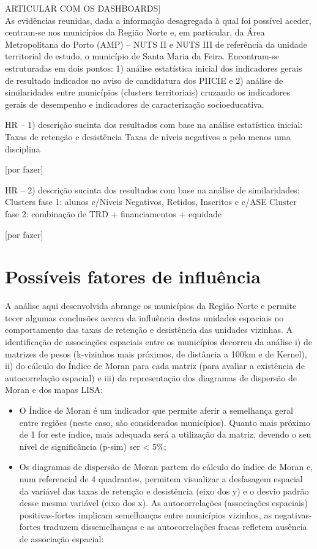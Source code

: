 \documentclass[
]{book}
\providecommand{\tightlist}{%
  \setlength{\itemsep}{0pt}\setlength{\parskip}{0pt}}
\begin{document}
ARTICULAR COM OS DASHBOARDS{]}\\
As evidências reunidas, dada a informação desagregada à qual foi possível aceder, centram-se nos municípios da Região Norte e, em particular, da Área Metropolitana do Porto (AMP) -- NUTS II e NUTS III de referência da unidade territorial de estudo, o município de Santa Maria da Feira. Encontram-se estruturadas em dois pontos: 1) análise estatística inicial dos indicadores gerais de resultado indicados no aviso de candidatura dos PIICIE e 2) análise de similaridades entre municípios (clusters territoriais) cruzando os indicadores gerais de desempenho e indicadores de caracterização socioeducativa.

HR -- 1) descrição sucinta dos resultados com base na análise estatística inicial:\\
Taxas de retenção e desistência
Taxas de níveis negativos a pelo menos uma disciplina

{[}por fazer{]}

HR -- 2) descrição sucinta dos resultados com base na análise de similaridades:
Clusters fase 1: alunos c/Níveis Negativos, Retidos, Inscritos e c/ASE
Cluster fase 2: combinação de TRD + financiamentos + equidade

{[}por fazer{]}

\hypertarget{possuxedveis-fatores-de-influuxeancia}{%
\section{Possíveis fatores de influência}\label{possuxedveis-fatores-de-influuxeancia}}

A análise aqui desenvolvida abrange os municípios da Região Norte e permite tecer algumas conclusões acerca da influência destas unidades espaciais no comportamento das taxas de retenção e desistência das unidades vizinhas. A identificação de associações espaciais entre os municípios decorreu da análise i) de matrizes de pesos (k-vizinhos mais próximos, de distância a 100km e de Kernel), ii) do cálculo do Índice de Moran para cada matriz (para avaliar a existência de autocorrelação espacial) e iii) da representação dos diagramas de dispersão de Moran e dos mapas LISA:

\begin{itemize}
\tightlist
\item
  O Índice de Moran é um indicador que permite aferir a semelhança geral entre regiões (neste caso, são considerados municípios). Quanto mais próximo de 1 for este índice, mais adequada será a utilização da matriz, devendo o seu nível de significância (p-sim) ser \textless{} 5\%;
\item
  Os diagramas de dispersão de Moran partem do cálculo do índice de Moran e, num referencial de 4 quadrantes, permitem visualizar a desfasagem espacial da variável das taxas de retenção e desistência (eixo dos y) e o desvio padrão desse mesma variável (eixo dos x). As autocorrelações (associações espaciais) positivas-fortes implicam semelhanças entre municípios vizinhos, as negativas-fortes traduzem dissemelhanças e as autocorrelações fracas refletem ausência de associação espacial:
\end{itemize}
\end{document}
